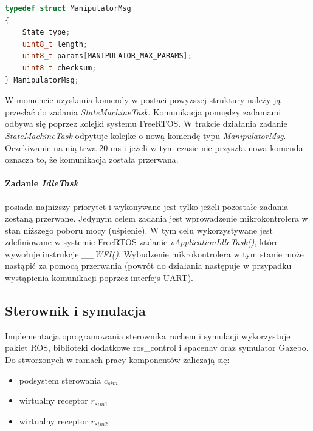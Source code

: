 \documentclass[a4paper, 12pt, twoside]{article}
\begin{document}
\begin{lstlisting}[language=C++,
                   directivestyle={\color{black}}
                   emph={int,char,double,float,unsigned},
                   emphstyle={\color{blue}}
                  ]
typedef struct ManipulatorMsg
{   
    State type;
    uint8_t length;
    uint8_t params[MANIPULATOR_MAX_PARAMS];
    uint8_t checksum;
} ManipulatorMsg;
\end{lstlisting}

W momencie uzyskania komendy w postaci powyższej struktury należy ją przesłać do zadania \textit{StateMachineTask}. Komunikacja pomiędzy zadaniami odbywa się poprzez kolejki systemu FreeRTOS. W trakcie działania zadanie \textit{StateMachineTask} odpytuje kolejke o nową komendę typu \textit{ManipulatorMsg}. Oczekiwanie na nią trwa 20 ms i jeżeli w tym czasie nie przyszła nowa komenda oznacza to, że komunikacja została przerwana. 

\paragraph{Zadanie \textit{IdleTask}} posiada najniższy priorytet i wykonywane jest tylko jeżeli pozostałe zadania zostaną przerwane. Jedynym celem zadania jest wprowadzenie mikrokontrolera w stan niższego poboru mocy (uśpienie). W tym celu wykorzystywane jest zdefiniowane w systemie FreeRTOS zadanie \textit{vApplicationIdleTask()}, które wywołuje instrukcje \textit{\_\_WFI()}. Wybudzenie mikrokontrolera w tym stanie może nastąpić za pomocą przerwania (powrót do działania następuje w przypadku wystąpienia komunikacji poprzez interfejs UART).

\subsection{Sterownik i symulacja}
\vspace{1.5 cm}
Implementacja oprogramowania sterownika ruchem i symulacji wykorzystuje pakiet ROS, biblioteki dodatkowe ros\_control i spacenav oraz symulator Gazebo. Do stworzonych w ramach pracy komponentów zaliczają się:

\begin{itemize}
\item podsystem sterowania $c_{sim}$
\item wirtualny receptor $r_{sim1}$
\item wirtualny receptor $r_{sim2}$
\end{itemize}
\end{document}
